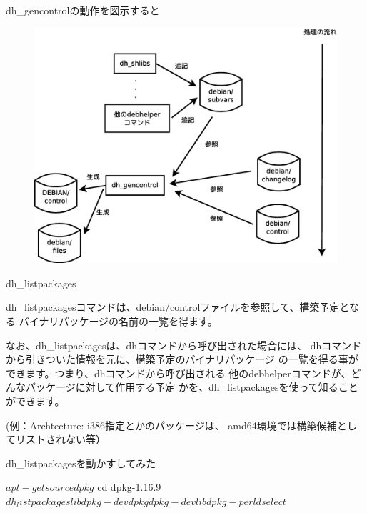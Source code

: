 \begin{frame}{dh\_gencontrolの動作を図示すると}

\begin{figure}[h]
\begin{center}
 \includegraphics[width=0.8\hsize]{image201301/debhelper/dh-gencontrol-gen.eps}
\end{center}
\end{figure}

\end{frame}

\begin{frame}{dh\_listpackages}

 dh\_listpackagesコマンドは、debian/controlファイルを参照して、構築予定となる
バイナリパッケージの名前の一覧を得ます。

 なお、dh\_listpackagesは、dhコマンドから呼び出された場合には、
dhコマンドから引きついた情報を元に、構築予定のバイナリパッケージ
の一覧を得る事ができます。つまり、dhコマンドから呼び出される
他のdebhelperコマンドが、どんなパッケージに対して作用する予定
かを、dh\_listpackagesを使って知ることができます。

(例：Archtecture: i386指定とかのパッケージは、
amd64環境では構築候補としてリストされない等）

\end{frame}

\begin{frame}[containsverbatim]{dh\_listpackagesを動かすしてみた}

\begin{commandline}
$ apt-get source dpkg
$ cd dpkg-1.16.9
$ dh_listpackages
libdpkg-dev
dpkg
dpkg-dev
libdpkg-perl
dselect
$
\end{commandline}


\end{frame}

